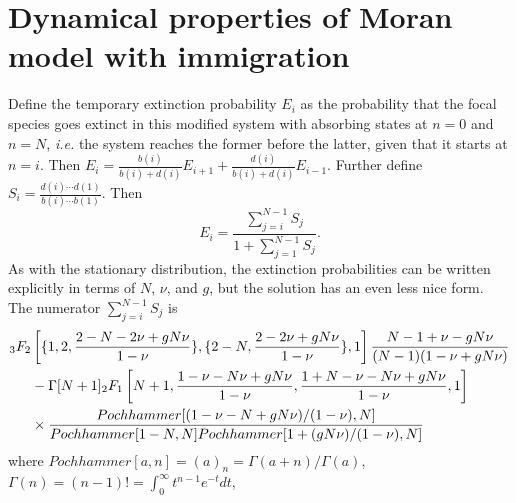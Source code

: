 \section*{Dynamical properties of Moran model with immigration}
Define the temporary extinction probability $E_i$ as the probability that the focal species goes extinct in this modified system with absorbing states at $n=0$ and $n=N$, \emph{i.e.} the system reaches the former before the latter, given that it starts at $n=i$. 
Then $E_i = \frac{b(i)}{b(i)+d(i)}E_{i+1} + \frac{d(i)}{b(i)+d(i)}E_{i-1}$. 
Further define $S_i = \frac{d(i)\cdots d(1)}{b(i)\cdots b(1)}$. 
Then 
\begin{equation}
E_{i} = \frac{\sum_{j=i}^{N-1}S_j}{1+\sum_{j=1}^{N-1}S_j}. 
\end{equation}
As with the stationary distribution, the extinction probabilities can be written explicitly in terms of $N$, $\nu$, and $g$, but the solution has an even less nice form. 
The numerator $\sum_{j=i}^{N-1}S_j$ is
\begin{align}
{}_3F_2&\left[\{1, 2, \frac{2-N-2\nu+g N \nu}{1-\nu}\}, \{2-N, \frac{2-2 \nu+g N \nu}{1-\nu}\}, 1\right]\frac{N-1+\nu-g N \nu}{(N-1) (1 - \nu + g N \nu)} \\
 &- \Gamma[N+1] {}_2F_1\left[N+1, \frac{1-\nu-N \nu+g N \nu}{1-\nu}, \frac{1+N-\nu-N \nu+g N \nu}{1-\nu}, 1\right] \notag \\
 &\times \frac{Pochhammer[(1-\nu-N+g N \nu)/(1-\nu),N]}{Pochhammer[1-N,N] Pochhammer[1+(g N \nu)/(1-\nu),N]} \notag
\end{align}
where
$Pochhammer[a,n] = (a)_n = \Gamma(a+n)/\Gamma(a)$, 
$\Gamma(n) = (n-1)! = \int_0^\infty t^{n-1}e^{-t}dt$, 
